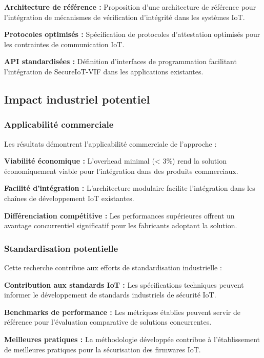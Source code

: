 \textbf{Architecture de référence :} Proposition d'une architecture de référence pour l'intégration de mécanismes de vérification d'intégrité dans les systèmes IoT.

\textbf{Protocoles optimisés :} Spécification de protocoles d'attestation optimisés pour les contraintes de communication IoT.

\textbf{API standardisées :} Définition d'interfaces de programmation facilitant l'intégration de SecureIoT-VIF dans les applications existantes.

\subsection{Impact industriel potentiel}

\subsubsection{Applicabilité commerciale}

Les résultats démontrent l'applicabilité commerciale de l'approche :

\textbf{Viabilité économique :} L'overhead minimal (< 3\%) rend la solution économiquement viable pour l'intégration dans des produits commerciaux.

\textbf{Facilité d'intégration :} L'architecture modulaire facilite l'intégration dans les chaînes de développement IoT existantes.

\textbf{Différenciation compétitive :} Les performances supérieures offrent un avantage concurrentiel significatif pour les fabricants adoptant la solution.

\subsubsection{Standardisation potentielle}

Cette recherche contribue aux efforts de standardisation industrielle :

\textbf{Contribution aux standards IoT :} Les spécifications techniques peuvent informer le développement de standards industriels de sécurité IoT.

\textbf{Benchmarks de performance :} Les métriques établies peuvent servir de référence pour l'évaluation comparative de solutions concurrentes.

\textbf{Meilleures pratiques :} La méthodologie développée contribue à l'établissement de meilleures pratiques pour la sécurisation des firmwares IoT.

